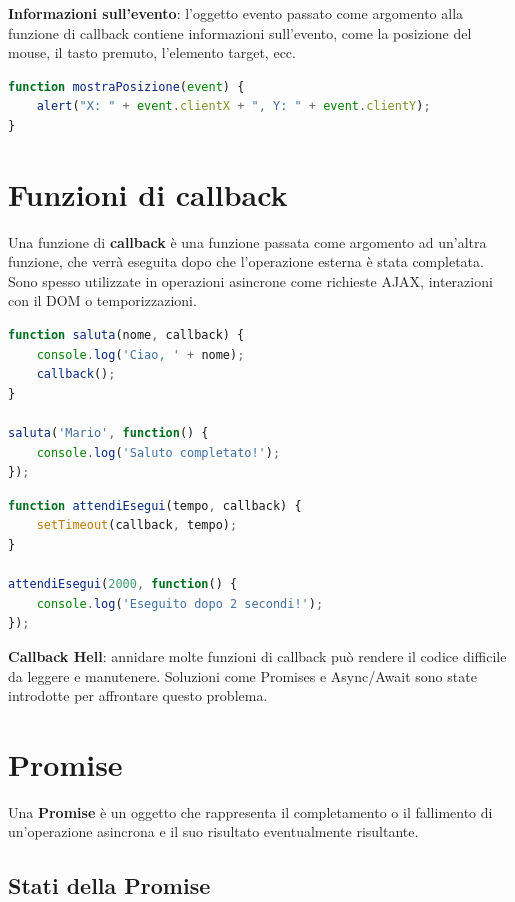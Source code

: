 \textbf{Informazioni sull'evento}: l'oggetto evento passato come argomento alla funzione di callback contiene informazioni sull'evento, come la posizione del mouse, il tasto premuto, l'elemento target, ecc.

\begin{lstlisting}[language=JavaScript]
function mostraPosizione(event) {
    alert("X: " + event.clientX + ", Y: " + event.clientY);
}
\end{lstlisting}

\section{Funzioni di callback}

Una funzione di \textbf{callback} è una funzione passata come argomento ad un'altra funzione, che verrà eseguita dopo che l'operazione esterna è stata completata. Sono spesso utilizzate in operazioni asincrone come richieste AJAX, interazioni con il DOM o temporizzazioni.

\begin{lstlisting}[language=JavaScript, caption=Esempio 1 di callback]
function saluta(nome, callback) {
    console.log('Ciao, ' + nome);
    callback();
}

saluta('Mario', function() {
    console.log('Saluto completato!');
});
\end{lstlisting}

\begin{lstlisting}[language=JavaScript, caption=Esempio 2 con setTimeout]
function attendiEsegui(tempo, callback) {
    setTimeout(callback, tempo);
}

attendiEsegui(2000, function() {
    console.log('Eseguito dopo 2 secondi!');
});
\end{lstlisting}

\textbf{Callback Hell}: annidare molte funzioni di callback può rendere il codice difficile da leggere e manutenere. Soluzioni come Promises e Async/Await sono state introdotte per affrontare questo problema.

\section{Promise}

Una \textbf{Promise} è un oggetto che rappresenta il completamento o il fallimento di un'operazione asincrona e il suo risultato eventualmente risultante.

\subsection{Stati della Promise}

